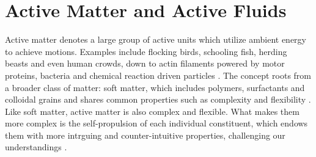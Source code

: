 \section{Active Matter and Active Fluids}
\label{active-fluids}

Active matter denotes a large group of active units which utilize ambient energy to achieve motions. Examples include flocking birds, schooling fish, herding beasts and even human crowds, down to actin filaments powered by motor proteins, bacteria and chemical reaction driven particles
\cite{Toner2005, Ramaswamy2010, Vicsek2012, Marchetti2013, Saintillan2013, Bechinger2016, Julicher2007}. The concept roots from a broader class of matter: soft matter, which includes polymers, surfactants and colloidal grains and shares common properties such as complexity and flexibility
\cite{DeGennes1992}. Like soft matter, active matter is also complex and flexible. What makes them more complex is the self-propulsion of each individual constituent, which endows them with more intrguing and counter-intuitive properties, challenging our understandings \cite{Glotzer2015}.

